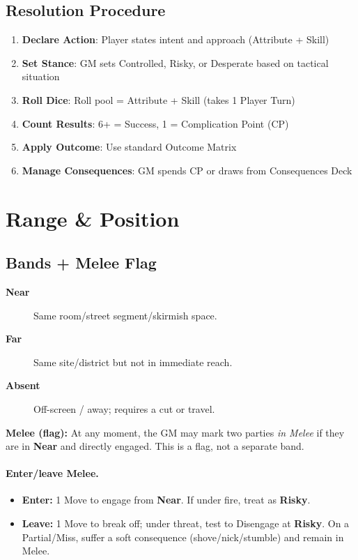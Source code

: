 \documentclass[11pt]{article}
\begin{document}
\subsection{Resolution Procedure}
\begin{enumerate}
    \item \textbf{Declare Action}: Player states intent and approach (Attribute + Skill)
    \item \textbf{Set Stance}: GM sets Controlled, Risky, or Desperate based on tactical situation
    \item \textbf{Roll Dice}: Roll pool = Attribute + Skill (takes 1 Player Turn)
    \item \textbf{Count Results}: 6+ = Success, 1 = Complication Point (CP)
    \item \textbf{Apply Outcome}: Use standard Outcome Matrix
    \item \textbf{Manage Consequences}: GM spends CP or draws from Consequences Deck
\end{enumerate}

\section{Range \& Position}

\subsection*{Bands + Melee Flag}
\begin{description}
  \item[\textbf{Near}] Same room/street segment/skirmish space.
  \item[\textbf{Far}] Same site/district but not in immediate reach.
  \item[\textbf{Absent}] Off-screen / away; requires a cut or travel.
\end{description}
\textbf{Melee (flag):} At any moment, the GM may mark two parties \emph{in Melee} if they are in \textbf{Near} and directly engaged. This is a flag, not a separate band.

\paragraph{Enter/leave Melee.}
\begin{itemize}
  \item \textbf{Enter:} 1 Move to engage from \textbf{Near}. If under fire, treat as \textbf{Risky}.
  \item \textbf{Leave:} 1 Move to break off; under threat, test to Disengage at \textbf{Risky}. On a Partial/Miss, suffer a soft consequence (shove/nick/stumble) and remain in Melee.
\end{itemize}
\end{document}
